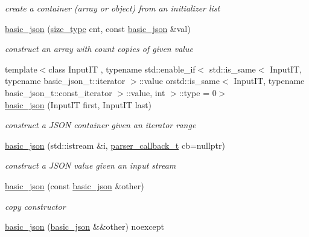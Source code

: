 \begin{DoxyCompactItemize}
\begin{DoxyCompactList}\small\item\em create a container (array or object) from an initializer list \end{DoxyCompactList}\item 
\hyperlink{classnlohmann_1_1basic__json_a112a2d8e76345ea64f71e2985fee4c52}{basic\-\_\-json} (\hyperlink{classnlohmann_1_1basic__json_a1579a8f72a230358d6cd1a6e8a62859b}{size\-\_\-type} cnt, const \hyperlink{classnlohmann_1_1basic__json}{basic\-\_\-json} \&val)
\begin{DoxyCompactList}\small\item\em construct an array with count copies of given value \end{DoxyCompactList}\item 
{\footnotesize template$<$class Input\-I\-T , typename std\-::enable\-\_\-if$<$ std\-::is\-\_\-same$<$ Input\-I\-T, typename basic\-\_\-json\-\_\-t\-::iterator $>$\-::value orstd\-::is\-\_\-same$<$ Input\-I\-T, typename basic\-\_\-json\-\_\-t\-::const\-\_\-iterator $>$\-::value, int $>$\-::type  = 0$>$ }\\\hyperlink{classnlohmann_1_1basic__json_af7acf3838a79363356f24538941a559c}{basic\-\_\-json} (Input\-I\-T first, Input\-I\-T last)
\begin{DoxyCompactList}\small\item\em construct a J\-S\-O\-N container given an iterator range \end{DoxyCompactList}\item 
\hyperlink{classnlohmann_1_1basic__json_a9857835334d38ba04959e348ca6be208}{basic\-\_\-json} (std\-::istream \&i, \hyperlink{classnlohmann_1_1basic__json_a9e35475e2027520a78e09f460dbe048a}{parser\-\_\-callback\-\_\-t} cb=nullptr)
\begin{DoxyCompactList}\small\item\em construct a J\-S\-O\-N value given an input stream \end{DoxyCompactList}\item 
\hyperlink{classnlohmann_1_1basic__json_a4ab93491f82545342562c7ee7e3166c7}{basic\-\_\-json} (const \hyperlink{classnlohmann_1_1basic__json}{basic\-\_\-json} \&other)
\begin{DoxyCompactList}\small\item\em copy constructor \end{DoxyCompactList}\item 
\hyperlink{classnlohmann_1_1basic__json_a73e150cbcba5643cb89de8f515eb64e2}{basic\-\_\-json} (\hyperlink{classnlohmann_1_1basic__json}{basic\-\_\-json} \&\&other) noexcept

\end{DoxyCompactItemize}
